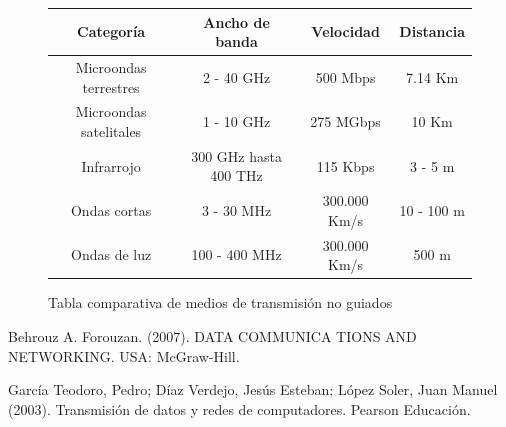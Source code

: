 \documentclass[a4paper,12pt]{article}
\begin{document}
\begin{figure}[h]
\begin{center}
\begin{tabular}{| c | c  | c | c | }
\hline
 \textbf{Categoría} & \textbf{Ancho de banda} & \textbf{Velocidad	} & \textbf{Distancia}\\ 
 \hline
 Microondas terrestres & 2 - 40 GHz & 500 Mbps & 7.14 Km \\
  \hline
 Microondas satelitales & 1 - 10 GHz & 275 MGbps & 10 Km \\
  \hline
 Infrarrojo & 300 GHz hasta 400 THz & 115 Kbps & 3 - 5 m \\
  \hline
 Ondas cortas & 3 - 30 MHz & 300.000 Km/s & 10 - 100 m \\
  \hline
 Ondas de luz & 100 - 400 MHz & 300.000 Km/s  & 500 m \\
 \hline
\end{tabular}
\caption{Tabla comparativa de medios de transmisión no guiados  }
\end{center}
\end{figure}


\begin{thebibliography}{12}
Behrouz A. Forouzan. (2007). DATA COMMUNICA TIONS AND NETWORKING. USA: McGraw-Hill.

García Teodoro, Pedro; Díaz Verdejo, Jesús Esteban; López Soler, Juan Manuel (2003). Transmisión de datos y redes de computadores. Pearson Educación.

 
\end{thebibliography}
\end{document}
